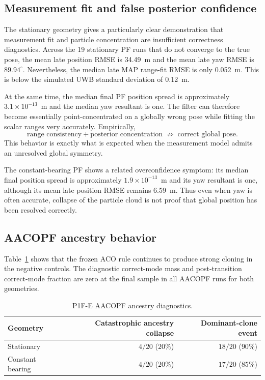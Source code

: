 \subsection{Measurement fit and false posterior confidence}
The stationary geometry gives a particularly clear demonstration that measurement fit and particle concentration are insufficient correctness diagnostics. Across the 19 stationary PF runs that do not converge to the true pose, the mean late position RMSE is \SI{34.49}{m} and the mean late yaw RMSE is $89.94^\circ$. Nevertheless, the median late MAP range-fit RMSE is only \SI{0.052}{m}. This is below the simulated UWB standard deviation of \SI{0.12}{m}.

At the same time, the median final PF position spread is approximately $3.1\times10^{-13}$~m and the median yaw resultant is one. The filter can therefore become essentially point-concentrated on a globally wrong pose while fitting the scalar ranges very accurately. Empirically,
\begin{equation}
    \text{range consistency} + \text{posterior concentration}
    \;\not\Rightarrow\;
    \text{correct global pose}.
\end{equation}
This behavior is exactly what is expected when the measurement model admits an unresolved global symmetry.

The constant-bearing PF shows a related overconfidence symptom: its median final position spread is approximately $1.9\times10^{-13}$~m and its yaw resultant is one, although its mean late position RMSE remains \SI{6.59}{m}. Thus even when yaw is often accurate, collapse of the particle cloud is not proof that global position has been resolved correctly.

\subsection{AACOPF ancestry behavior}
Table~\ref{tab:p1fe_ancestry} shows that the frozen ACO rule continues to produce strong cloning in the negative controls. The diagnostic correct-mode mass and post-transition correct-mode fraction are zero at the final sample in all AACOPF runs for both geometries.

\begin{table}[htbp]
    \centering
    \caption{P1F-E AACOPF ancestry diagnostics.}
    \label{tab:p1fe_ancestry}
    \begin{tabular}{lrr}
        \toprule
        Geometry & Catastrophic ancestry collapse & Dominant-clone event\\
        \midrule
        Stationary & $4/20$ ($20\%$) & $18/20$ ($90\%$)\\
        Constant bearing & $4/20$ ($20\%$) & $17/20$ ($85\%$)\\
        \bottomrule
    \end{tabular}
\end{table}

